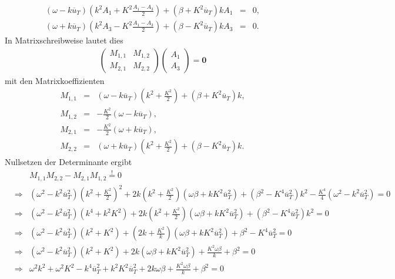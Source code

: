 \documentclass{book}
\newcommand{\hastobe}{\stackrel{!}{=}}
\newcommand\newoverline[1]{%
\overline{#1}}
\begin{document}
%
\begin{eqnarray}
\left(\omega - k\newoverline{u}_T\right)\left(k^2A_1 + K^2\frac{A_1 - A_3}{2}\right) + \left(\beta + K^2\newoverline{u}_T\right)kA_1 & = & 0,\\
\left(\omega + k\newoverline{u}_T\right)\left(k^2A_3 - K^2\frac{A_1 - A_3}{2}\right) + \left(\beta - K^2\newoverline{u}_T\right)kA_3 & = & 0.
\end{eqnarray}
%
In Matrixschreibweise lautet dies
%
\begin{eqnarray}
\left(\begin{array}{cc}
M_{1, 1}&M_{1, 2}\\
M_{2, 1}&M_{2, 2}
\end{array}\right)\left(\begin{array}{c}
A_1\\
A_3
\end{array}\right) = \mathbf{0}
\end{eqnarray}
%
mit den Matrixkoeffizienten
%
\begin{eqnarray}
M_{1, 1} & = & \left(\omega - k\newoverline{u}_T\right)\left(k^2 + \frac{K^2}{2}\right) + \left(\beta + K^2\newoverline{u}_T\right)k,\\
M_{1, 2} & = & -\frac{K^2}{2}\left(\omega - k\newoverline{u}_T\right),\\
M_{2, 1} & = & -\frac{K^2}{2}\left(\omega + k\newoverline{u}_T\right),\\
M_{2, 2} & = & \left(\omega + k\newoverline{u}_T\right)\left(k^2 + \frac{K^2}{2}\right) + \left(\beta - K^2\newoverline{u}_T\right)k.
\end{eqnarray}
%
Nullsetzen der Determinante ergibt
%
\begin{eqnarray}
&&M_{1, 1}M_{2, 2} - M_{2, 1}M_{1, 2}\hastobe0\nonumber\\
&\Rightarrow&\left(\omega^2 - k^2\newoverline{u}_T^2\right)\left(k^2 + \frac{K^2}{2}\right)^2 + 2k\left(k^2 + \frac{K^2}{2}\right)\left(\omega\beta + kK^2\newoverline{u}_T^2\right) + \left(\beta^2 - K^4\newoverline{u}_T^2\right)k^2 - \frac{K^4}{4}\left(\omega^2 - k^2\newoverline{u}_T^2\right) = 0\nonumber\\
&\Rightarrow&\left(\omega^2 - k^2\newoverline{u}_T^2\right)\left(k^4 + k^2K^2\right) + 2k\left(k^2 + \frac{K^2}{2}\right)\left(\omega\beta + kK^2\newoverline{u}_T^2\right) + \left(\beta^2 - K^4\newoverline{u}_T^2\right)k^2 = 0\nonumber\\
&\Rightarrow&\left(\omega^2 - k^2\newoverline{u}_T^2\right)\left(k^2 + K^2\right) + \left(2k + \frac{K^2}{k}\right)\left(\omega\beta + kK^2\newoverline{u}_T^2\right) + \beta^2 - K^4\newoverline{u}_T^2 = 0\nonumber\\
&\Rightarrow&\left(\omega^2 - k^2\newoverline{u}_T^2\right)\left(k^2 + K^2\right) + 2k\left(\omega\beta + kK^2\newoverline{u}_T^2\right) + \frac{K^2\omega\beta}{k} + \beta^2 = 0\nonumber\\
&\Rightarrow&\omega^2k^2 + \omega^2K^2 - k^4\newoverline{u}_T^2 + k^2K^2\newoverline{u}_T^2 + 2k\omega\beta + \frac{K^2\omega\beta}{k} + \beta^2 = 0\nonumber
\end{eqnarray}
\end{document}
